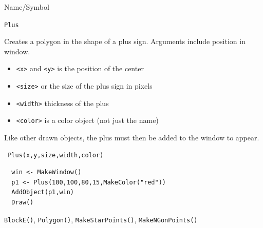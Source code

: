 \begin{desc}{Name/Symbol}
\item[Name/Symbol]  	\verb+Plus+ 

\item[Description] Creates a polygon in the shape of a
 plus sign. Arguments include position in window.
\begin{itemize}
\item \verb+<x>+ and \verb+<y>+ is the position of the center
\item \verb+<size>+ or the size of the plus sign in pixels
\item \verb+<width>+ thickness of the plus
\item \verb+<color>+ is a color object (not just the name)
\end{itemize}

Like other drawn objects, the plus must then be added to the window
to appear.

\item[Usage]		
\begin{verbatim}
 Plus(x,y,size,width,color)
\end{verbatim}

\item[Example]	
\begin{verbatim}
  win <- MakeWindow()
  p1 <- Plus(100,100,80,15,MakeColor("red"))
  AddObject(p1,win)
  Draw()
\end{verbatim}

\item[See Also]   
\verb+BlockE()+, \verb+Polygon()+, \verb+MakeStarPoints()+,
\verb+MakeNGonPoints()+
\end{desc}

